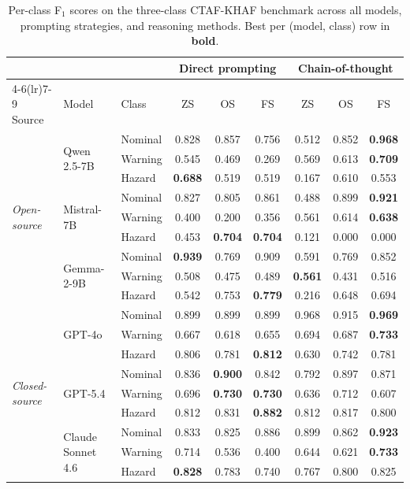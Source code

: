 \begin{table}[ht]
\centering
\caption{Per-class F$_1$ scores on the three-class CTAF-KHAF benchmark across all models, prompting strategies, and reasoning methods. Best per (model, class) row in \textbf{bold}.}
\label{tab:perclass_3class}
\renewcommand{\arraystretch}{1.10}
\small
\begin{tabular}{l l l *{6}{c}}
\toprule
 & & & \multicolumn{3}{c}{Direct prompting} & \multicolumn{3}{c}{Chain-of-thought} \\
\cmidrule(lr){4-6}\cmidrule(lr){7-9}
Source & Model & Class & ZS & OS & FS & ZS & OS & FS \\
\midrule
  \multirow{9}{*}{\textit{Open-source}} & \multirow{3}{*}{Qwen 2.5-7B} & Nominal & 0.828 & 0.857 & 0.756 & 0.512 & 0.852 & \textbf{0.968} \\
   &  & Warning & 0.545 & 0.469 & 0.269 & 0.569 & 0.613 & \textbf{0.709} \\
   &  & Hazard & \textbf{0.688} & 0.519 & 0.519 & 0.167 & 0.610 & 0.553 \\
\cmidrule(lr){2-9}
   & \multirow{3}{*}{Mistral-7B} & Nominal & 0.827 & 0.805 & 0.861 & 0.488 & 0.899 & \textbf{0.921} \\
   &  & Warning & 0.400 & 0.200 & 0.356 & 0.561 & 0.614 & \textbf{0.638} \\
   &  & Hazard & 0.453 & \textbf{0.704} & \textbf{0.704} & 0.121 & 0.000 & 0.000 \\
\cmidrule(lr){2-9}
   & \multirow{3}{*}{Gemma-2-9B} & Nominal & \textbf{0.939} & 0.769 & 0.909 & 0.591 & 0.769 & 0.852 \\
   &  & Warning & 0.508 & 0.475 & 0.489 & \textbf{0.561} & 0.431 & 0.516 \\
   &  & Hazard & 0.542 & 0.753 & \textbf{0.779} & 0.216 & 0.648 & 0.694 \\
\midrule
  \multirow{9}{*}{\textit{Closed-source}} & \multirow{3}{*}{GPT-4o} & Nominal & 0.899 & 0.899 & 0.899 & 0.968 & 0.915 & \textbf{0.969} \\
   &  & Warning & 0.667 & 0.618 & 0.655 & 0.694 & 0.687 & \textbf{0.733} \\
   &  & Hazard & 0.806 & 0.781 & \textbf{0.812} & 0.630 & 0.742 & 0.781 \\
\cmidrule(lr){2-9}
   & \multirow{3}{*}{GPT-5.4} & Nominal & 0.836 & \textbf{0.900} & 0.842 & 0.792 & 0.897 & 0.871 \\
   &  & Warning & 0.696 & \textbf{0.730} & \textbf{0.730} & 0.636 & 0.712 & 0.607 \\
   &  & Hazard & 0.812 & 0.831 & \textbf{0.882} & 0.812 & 0.817 & 0.800 \\
\cmidrule(lr){2-9}
   & \multirow{3}{*}{Claude Sonnet 4.6} & Nominal & 0.833 & 0.825 & 0.886 & 0.899 & 0.862 & \textbf{0.923} \\
   &  & Warning & 0.714 & 0.536 & 0.400 & 0.644 & 0.621 & \textbf{0.733} \\
   &  & Hazard & \textbf{0.828} & 0.783 & 0.740 & 0.767 & 0.800 & 0.825 \\
\bottomrule
\end{tabular}
\end{table}